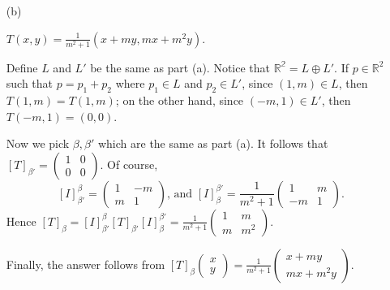 \begin{Exercise}
\begin{enumerate}[(a)]
\item[(b)]
\begin{answer}
$T(x,y) = \frac{1}{m^2+1}\left(x+m y,m x+m^2 y\right)$.
\end{answer}
\begin{solution}
Define $L$ and $L'$ be the same as part (a). Notice that $\mathbb{R^2} = L\oplus L'$. If $p\in \mathbb{R}^2$ such that $p=p_1+p_2$ where $p_1\in L$ and $p_2\in L'$, since $(1,m)\in L$, then $T(1,m) = T(1,m)$; on the other hand, since $(-m,1)\in L'$, then $T(-m,1) = (0,0)$. 

Now we pick $\beta,\beta'$ which are the same as part (a). It follows that $[T]_{\beta'} = \begin{pmatrix}
1 & 0 \\
0 & 0
\end{pmatrix}$. Of course, 
$$
[I]_{\beta'}^{\beta} = \begin{pmatrix}
1 & -m \\
m & 1
\end{pmatrix}\text{, and } [I]_{\beta}^{\beta'} = \frac{1}{m^2+1}\begin{pmatrix}
1 & m \\
-m & 1
\end{pmatrix}.
$$
Hence $[T]_{\beta} = [I]_{\beta'}^{\beta} [T]_{\beta'} [I]_{\beta}^{\beta'} = \frac{1}{m^2+1}\begin{pmatrix}
1 & m \\
m & m^2
\end{pmatrix}$. 

Finally, the answer follows from $[T]_{\beta}\begin{pmatrix}
x \\
y
\end{pmatrix} = \frac{1}{m^2+1}\begin{pmatrix}
x+m y \\
m x + m^2 y
\end{pmatrix}$.
\end{solution}

\end{enumerate}
\end{Exercise}